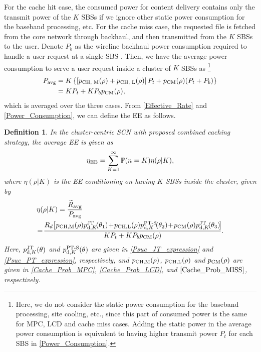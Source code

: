 \documentclass[twocolumns,10pt]{IEEEtran}
\newtheorem{definition}{Definition}
\begin{document}
For the cache hit case, the consumed power for content delivery contains only the transmit power of the $K$ SBSs if we ignore other static power consumption for the baseband processing, etc.
For the cache miss case, the requested file is fetched from the core network through backhaul, and then transmitted from the $K$ SBSs to the user. Denote $P_b$ as the wireline backhaul power consumption required to handle a user request at a single SBS \cite{backhaul}. Then, we have the average power consumption to serve a user request inside a cluster of $K$ SBSs as \footnote{Here, we do not consider the static power consumption for the baseband processing, site cooling, etc., since this part of consumed power is the same for MPC, LCD and cache miss cases. Adding the static power in the average power consumption is equivalent to having higher transmit power $P_t$ for each SBS in \eqref{Power_Consumption}.}
\begin{align}
\label{Power_Consumption}
P_{\text{avg}} &=K\left\{ \left[p_{\textnormal{CH, M}}(\rho) +p_{\textnormal{CH, L}}(\rho)\right]  P_t+p_{\textnormal{CM}}(\rho) (P_t + P_b)\right\} \nonumber \\
&=K P_t +K P_b p_{\textnormal{CM}}(\rho),
\end{align}
which is averaged over the three cases. From \eqref{Effective_Rate} and \eqref{Power_Consumption}, we can define the EE as follows.


\begin{definition}
	 In the cluster-centric SCN with proposed combined caching strategy, the average EE is given as
	\begin{eqnarray}
    \eta_{\textnormal{EE}}=\sum\limits_{K=1}^{\infty} \mathbb{P}(n=K) \eta(\rho| K),
	\label{average_ee}
	\end{eqnarray}
	where $\eta(\rho| K)$ is the EE conditioning on having $K$ SBSs inside the cluster, given by
\begin{equation}
	\begin{split}
	& \eta(\rho| K)=\frac{\widetilde{R}_{\textnormal{avg}}}{P_{\textnormal{avg}}} \\
	& \!= \! \frac{R_d  \!\left[p_{\textnormal{CH,M}} (\rho)p_{\textnormal{d},K}^{\textnormal{JT}}\!(\theta_1)  \!+ \! p_{\textnormal{CH,L}}(\rho) p_{\textnormal{d},K}^{\textnormal{PT-S}}\!(\theta_2)   \!+ \! p_{\textnormal{CM}}(\rho) p_{\textnormal{d},K}^{\textnormal{JT}}\!(\theta_3)\!\right] \!}{K P_t +K P_b p_{\textnormal{CM}}(\rho)}.
	\end{split}
	\label{EE_definition}
	\end{equation} Here, $p_{\textnormal{d},K}^{\textnormal{JT}} (\theta) $ and $ p_{\textnormal{d},K}^{\textnormal{PT-S}} (\theta)$ are given in \eqref{Psuc_JT_expression} and \eqref{Psuc_PT_expression}, respectively, and 
$p_{\textnormal{CH,M}}(\rho)$, $p_{\textnormal{CH,L}}(\rho)$ and $p_{\textnormal{CM}}(\rho)$ are given in \eqref{Cache_Prob_MPC}, \eqref{Cache_Prob_LCD}, and $ \eqref{Cache_Prob_MISS}$, respectively.
\end{definition}
\end{document}
